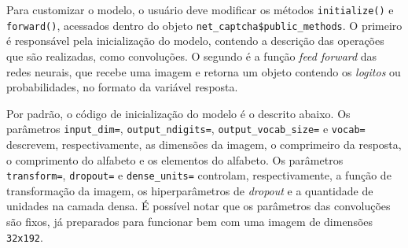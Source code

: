 \documentclass[12pt,twoside,brazilian]{book}
\begin{document}
Para customizar o modelo, o usuário deve modificar os métodos
\texttt{initialize()} e \texttt{forward()}, acessados dentro do objeto
\texttt{net\_captcha\$public\_methods}. O primeiro é responsável pela
inicialização do modelo, contendo a descrição das operações que são
realizadas, como convoluções. O segundo é a função \emph{feed forward}
das redes neurais, que recebe uma imagem e retorna um objeto contendo os
\emph{logitos} ou probabilidades, no formato da variável resposta.

Por padrão, o código de inicialização do modelo é o descrito abaixo. Os
parâmetros \texttt{input\_dim=}, \texttt{output\_ndigits=},
\texttt{output\_vocab\_size=} e \texttt{vocab=} descrevem,
respectivamente, as dimensões da imagem, o comprimeiro da resposta, o
comprimento do alfabeto e os elementos do alfabeto. Os parâmetros
\texttt{transform=}, \texttt{dropout=} e \texttt{dense\_units=}
controlam, respectivamente, a função de transformação da imagem, os
hiperparâmetros de \emph{dropout} e a quantidade de unidades na camada
densa. É possível notar que os parâmetros das convoluções são fixos, já
preparados para funcionar bem com uma imagem de dimensões
\texttt{32x192}.
\end{document}
